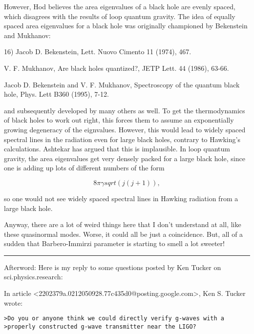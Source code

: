 However, Hod believes the area eigenvalues of a black hole are evenly
spaced, which disagrees with the results of loop quantum gravity.  The
idea of equally spaced area eigenvalues for a black hole was originally
championed by Bekenstein and Mukhanov:

16) Jacob D. Bekenstein, Lett. Nuovo Cimento 11 (1974), 467.

V. F. Mukhanov, Are black holes quantized?, JETP Lett. 44 (1986), 63-66.

Jacob D. Bekenstein and V. F. Mukhanov, Spectroscopy of the quantum
black hole, Phys. Lett B360 (1995), 7-12.

and subsequently developed by many others as well.  To get the
thermodynamics of black holes to work out right, this forces them to
assume an exponentially growing degeneracy of the eignvalues.  However,
this would lead to widely spaced spectral lines in the radiation even
for large black holes, contrary to Hawking's calculations.  Ashtekar has
argued that this is implausible.  In loop quantum gravity, the area
eigenvalues get very densely packed for a large black hole, since one is
adding up lots of different numbers of the form

$$
8 \pi  \gamma  sqrt(j(j+1)), 
$$
    
so one would not see widely spaced spectral lines in Hawking
radiation from a large black hole.  

Anyway, there are a lot of weird things here that I don't understand at
all, like these quasinormal modes.  Worse, it could all be just a
coincidence.  But, all of a sudden that Barbero-Immirzi parameter
is starting to smell a lot sweeter!

\par\noindent\rule{\textwidth}{0.4pt}


Afterword: Here is my reply to some questions posted by Ken Tucker on
sci.physics.research:

In article <2202379a.0212050928.77c435d0@posting.google.com>,
Ken S. Tucker wrote:

\begin{verbatim}
>Do you or anyone think we could directly verify g-waves with a
>properly constructed g-wave transmitter near the LIGO?
\end{verbatim}
    

